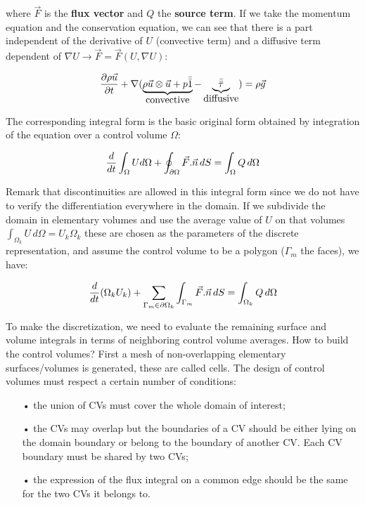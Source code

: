 where $\vec{F}$ is the \textbf{flux vector} and $Q$ the \textbf{source term}. If we take the momentum equation and the conservation equation, we can see that there is a part independent of the derivative of $U$ (convective term) and a diffusive term dependent of $\nabla U \rightarrow \vec{F} = \vec{F}(U,\nabla U)$: 

\begin{equation}
\frac{\partial \rho \vec{u}}{\partial t} + \nabla (\underbrace{\rho \vec{u}\otimes \vec{u}+ p \bar{\bar{1}}}_{\mbox{convective}}  - \underbrace{\bar{\bar{\tau}}}_{\mbox{diffusive}}) = \rho \vec{g}
\end{equation}

The corresponding integral form is the basic original form obtained by integration of the equation over a control volume $\Omega$: 

\begin{equation}
\frac{d}{dt}\int _\Omega U d\Omega + \oint _{\partial \Omega} \vec{F}.\vec{n}\, dS = \int _{\Omega} Q \, d\Omega
\end{equation}

Remark that discontinuities are allowed in this integral form since we do not have to verify the differentiation everywhere in the domain. If we subdivide the domain in elementary volumes and use the average value of $U$ on that volumes $\int _{\Omega _k}U\, d\Omega = U_k \Omega _k$ these are chosen as the parameters of the discrete representation, and assume the control volume to be a polygon ($\Gamma _m$ the faces), we have: 

\begin{equation}
\frac{d}{dt}(\Omega _k U_k) + \sum _{\Gamma _m \in \partial \Omega _k} \int _{\Gamma _m} \vec{F}.\vec{n}\, dS = \int _{\Omega _k}Q\, d\Omega
\end{equation}

To make the discretization, we need to evaluate the remaining surface and volume integrals in terms of neighboring control volume averages. How to build the control volumes? First a mesh of non-overlapping elementary surfaces/volumes is generated, these are called cells. The design of control volumes must respect a certain number of conditions: \\

\begin{itemize}
\item[•] the union of CVs must cover the whole domain of interest; 
\item[•] the CVs may overlap but the boundaries of a CV should be either lying on the domain boundary or belong to the boundary of another CV. Each CV boundary must be shared by two CVs;
\item[•] the expression of the flux integral on a common edge should be the same for the two CVs it belongs to. \\
\end{itemize}

